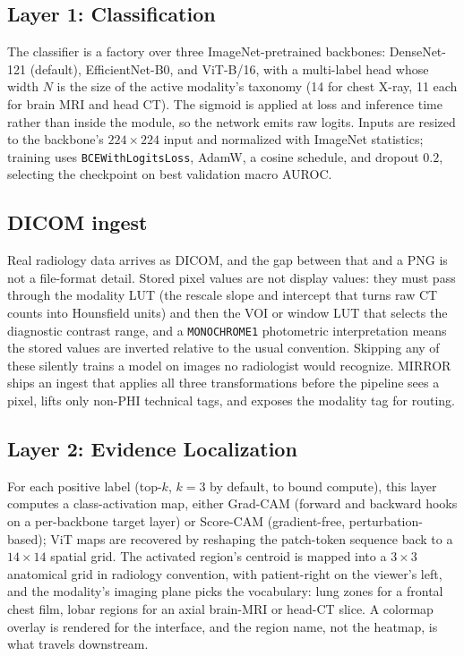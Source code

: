 \documentclass[conference]{IEEEtran}
\newcommand{\code}[1]{\texttt{\small #1}}
\begin{document}
\subsection{Layer 1: Classification}
The classifier is a factory over three ImageNet-pretrained backbones: DenseNet-121
(default), EfficientNet-B0, and ViT-B/16, with a multi-label head whose width $N$
is the size of the active modality's taxonomy (14 for chest X-ray, 11 each for
brain MRI and head CT). The sigmoid is applied at loss and inference time rather
than inside the module, so the network emits raw logits. Inputs are resized to the
backbone's $224\times224$ input and normalized with ImageNet statistics; training
uses \code{BCEWithLogitsLoss}, AdamW, a cosine schedule, and dropout $0.2$,
selecting the checkpoint on best validation macro AUROC.

\subsection{DICOM ingest}
Real radiology data arrives as DICOM, and the gap between that and a PNG is not a
file-format detail. Stored pixel values are not display values: they must pass
through the modality LUT (the rescale slope and intercept that turns raw CT counts
into Hounsfield units) and then the VOI or window LUT that selects the diagnostic
contrast range, and a \code{MONOCHROME1} photometric interpretation means the
stored values are inverted relative to the usual convention. Skipping any of these
silently trains a model on images no radiologist would recognize. MIRROR ships an
ingest that applies all three transformations before the pipeline sees a pixel,
lifts only non-PHI technical tags, and exposes the modality tag for routing.

\subsection{Layer 2: Evidence Localization}
For each positive label (top-$k$, $k{=}3$ by default, to bound compute), this layer
computes a class-activation map, either Grad-CAM (forward and backward hooks on a
per-backbone target layer) or Score-CAM (gradient-free, perturbation-based); ViT
maps are recovered by reshaping the patch-token sequence back to a $14\times14$
spatial grid. The activated region's centroid is mapped into a $3\times3$
anatomical grid in radiology convention, with patient-right on the viewer's left,
and the modality's imaging plane picks the vocabulary: lung zones for a frontal
chest film, lobar regions for an axial brain-MRI or head-CT slice. A colormap
overlay is rendered for the interface, and the region name, not the heatmap, is
what travels downstream.
\end{document}
